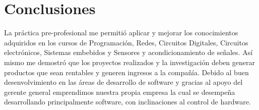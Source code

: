 \cleardoublepage
{}
{}
\chapter*{Conclusiones}

La práctica pre-profesional me permitió aplicar y mejorar los conocimientos adquiridos en los cursos de Programación, Redes, Circuitos Digitales, Circuitos electrónicos, Sistemas embebidos y Sensores y acondicionamiento de señales. Así mismo me demostró que los proyectos realizados y la investigación deben generar productos que sean rentables y generen ingresos a la compañía. Debido al buen desenvolvimiento en las áreas de desarrollo de software y gracias al apoyo del gerente general emprendimos nuestra propia empresa la cual se desempeña desarrollando principalmente software, con inclinaciones al control de hardware.